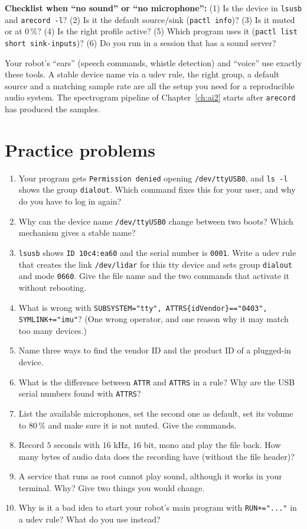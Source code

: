 \textbf{Checklist when ``no sound'' or ``no microphone'':} (1) Is the device in \texttt{lsusb} and \texttt{arecord -l}? (2) Is it the default source/sink (\texttt{pactl info})? (3) Is it muted or at $0\,\%$? (4) Is the right profile active? (5) Which program uses it (\verb|pactl list short sink-inputs|)? (6) Do you run in a session that has a sound server?

\begin{aibox}
Your robot's ``ears'' (speech commands, whistle detection) and ``voice'' use exactly these tools. A stable device name via a udev rule, the right group, a default source and a matching sample rate are all the setup you need for a reproducible audio system. The spectrogram pipeline of Chapter~\ref{ch:ai2} starts after \texttt{arecord} has produced the samples.
\end{aibox}

\section*{Practice problems}
\begin{enumerate}[label=\textbf{\thechapter.\arabic*}]
  \item Your program gets \texttt{Permission denied} opening \texttt{/dev/ttyUSB0}, and \texttt{ls -l} shows the group \texttt{dialout}. Which command fixes this for your user, and why do you have to log in again?
  \item Why can the device name \texttt{/dev/ttyUSB0} change between two boots? Which mechanism gives a stable name?
  \item \texttt{lsusb} shows \texttt{ID 10c4:ea60} and the serial number is \texttt{0001}. Write a udev rule that creates the link \texttt{/dev/lidar} for this tty device and sets group \texttt{dialout} and mode \texttt{0660}. Give the file name and the two commands that activate it without rebooting.
  \item What is wrong with \verb|SUBSYSTEM="tty", ATTRS{idVendor}=="0403", SYMLINK+="imu"|? (One wrong operator, and one reason why it may match too many devices.)
  \item Name three ways to find the vendor ID and the product ID of a plugged-in device.
  \item What is the difference between \texttt{ATTR} and \texttt{ATTRS} in a rule? Why are the USB serial numbers found with \texttt{ATTRS}?
  \item List the available microphones, set the second one as default, set its volume to $80\,\%$ and make sure it is not muted. Give the commands.
  \item Record $5$ seconds with $16$ kHz, $16$ bit, mono and play the file back. How many bytes of audio data does the recording have (without the file header)?
  \item A service that runs as root cannot play sound, although it works in your terminal. Why? Give two things you would change.
  \item[\textbf{\thechapter.10}$\star$] Why is it a bad idea to start your robot's main program with \texttt{RUN+="..."} in a udev rule? What do you use instead?
\end{enumerate}
